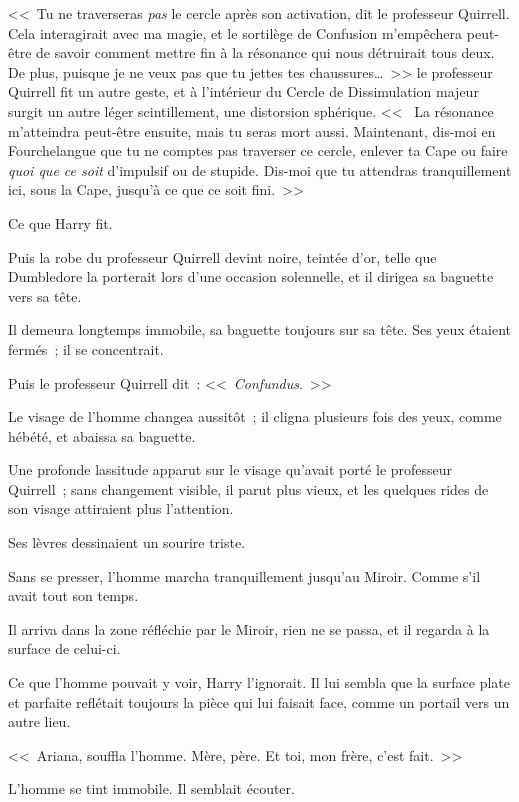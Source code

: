 <<~Tu ne traverseras \emph{pas} le cercle après son activation, dit le professeur Quirrell. Cela interagirait avec ma magie, et le sortilège de Confusion m'empêchera peut-être de savoir comment mettre fin à la résonance qui nous détruirait tous deux. De plus, puisque je ne veux pas que tu jettes tes chaussures…~>> le professeur Quirrell fit un autre geste, et à l'intérieur du Cercle de Dissimulation majeur surgit un autre léger scintillement, une distorsion sphérique. <<~ La résonance m'atteindra peut-être ensuite, mais tu seras mort aussi. Maintenant, dis-moi en Fourchelangue que tu ne comptes pas traverser ce cercle, enlever ta Cape ou faire \emph{quoi que ce soit} d'impulsif ou de stupide. Dis-moi que tu attendras tranquillement ici, sous la Cape, jusqu'à ce que ce soit fini.~>>

Ce que Harry fit.

Puis la robe du professeur Quirrell devint noire, teintée d'or, telle que Dumbledore la porterait lors d'une occasion solennelle, et il dirigea sa baguette vers sa tête.

Il demeura longtemps immobile, sa baguette toujours sur sa tête. Ses yeux étaient fermés~; il se concentrait.

Puis le professeur Quirrell dit~: <<~\emph{Confundus}.~>>

Le visage de l'homme changea aussitôt~; il cligna plusieurs fois des yeux, comme hébété, et abaissa sa baguette.

Une profonde lassitude apparut sur le visage qu'avait porté le professeur Quirrell~; sans changement visible, il parut plus vieux, et les quelques rides de son visage attiraient plus l'attention.

Ses lèvres dessinaient un sourire triste.

Sans se presser, l'homme marcha tranquillement jusqu'au Miroir. Comme s'il avait tout son temps.

Il arriva dans la zone réfléchie par le Miroir, rien ne se passa, et il regarda à la surface de celui-ci.

Ce que l'homme pouvait y voir, Harry l'ignorait. Il lui sembla que la surface plate et parfaite reflétait toujours la pièce qui lui faisait face, comme un portail vers un autre lieu.

<<~Ariana, souffla l'homme. Mère, père. Et toi, mon frère, c'est fait.~>>

L'homme se tint immobile. Il semblait écouter.

